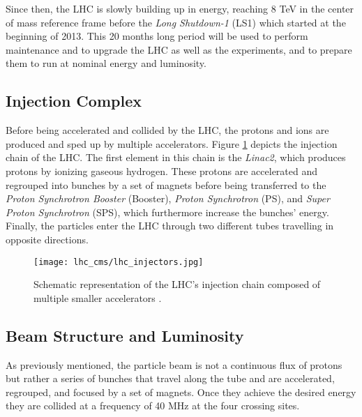             Since then, the LHC is slowly building up in energy, reaching 8 TeV in the center of mass reference frame before the \emph{Long Shutdown-1} (LS1) which started at the beginning of 2013. This 20 months long period will be used to perform maintenance and to upgrade the LHC as well as the experiments, and to prepare them to run at nominal energy and luminosity.

        \subsection{Injection Complex}

            Before being accelerated and collided by the LHC, the protons and ions are produced and sped up by multiple accelerators. Figure \ref{fig:lhc_cms__lhc_injection_chain} depicts the injection chain of the LHC. The first element in this chain is the \emph{Linac2}, which produces protons by ionizing gaseous hydrogen. These protons are accelerated and regrouped into bunches by a set of magnets before being transferred to the \emph{Proton Synchrotron Booster} (Booster), \emph{Proton Synchrotron} (PS), and \emph{Super Proton Synchrotron} (SPS), which furthermore increase the bunches' energy. Finally, the particles enter the LHC through two different tubes travelling in opposite directions.

            \begin{figure}[h!]
                \centering
                \texttt{[image: lhc\_cms/lhc\_injectors.jpg]}
                \caption{Schematic representation of the LHC's injection chain composed of multiple smaller accelerators \Cite{TE-EPC-LPC_in_LHC}.}
                \label{fig:lhc_cms__lhc_injection_chain}
            \end{figure}

        \subsection{Beam Structure and Luminosity}

            As previously mentioned, the particle beam is not a continuous flux of protons but rather a series of bunches that travel along the tube and are accelerated, regrouped, and focused by a set of magnets. Once they achieve the desired energy they are collided at a frequency of 40 MHz at the four crossing sites. \\

